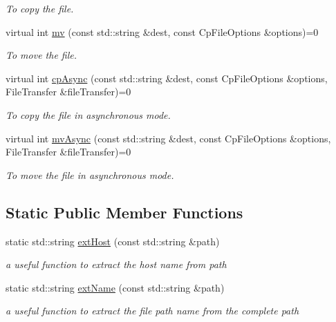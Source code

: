 \begin{DoxyCompactItemize}
\begin{DoxyCompactList}\small\item\em To copy the file. \item\end{DoxyCompactList}\item 
virtual int \hyperlink{classFileProxy_ac5ad61b772170696f71f37d784b59fa5}{mv} (const std::string \&dest, const CpFileOptions \&options)=0
\begin{DoxyCompactList}\small\item\em To move the file. \item\end{DoxyCompactList}\item 
virtual int \hyperlink{classFileProxy_afb7956f9e460ebf18622e5240f4f9dbf}{cpAsync} (const std::string \&dest, const CpFileOptions \&options, FileTransfer \&fileTransfer)=0
\begin{DoxyCompactList}\small\item\em To copy the file in asynchronous mode. \item\end{DoxyCompactList}\item 
virtual int \hyperlink{classFileProxy_a70e2f40c0b15d3640d631f914a2e627b}{mvAsync} (const std::string \&dest, const CpFileOptions \&options, FileTransfer \&fileTransfer)=0
\begin{DoxyCompactList}\small\item\em To move the file in asynchronous mode. \item\end{DoxyCompactList}\end{DoxyCompactItemize}
\subsection*{Static Public Member Functions}
\begin{DoxyCompactItemize}
\item 
static std::string \hyperlink{classFileProxy_ac1e4c8027e5e13ccbe1115f056d7b210}{extHost} (const std::string \&path)
\begin{DoxyCompactList}\small\item\em a useful function to extract the host name from path \item\end{DoxyCompactList}\item 
static std::string \hyperlink{classFileProxy_a73be5ad90755f66319b66f3fcf487f25}{extName} (const std::string \&path)
\begin{DoxyCompactList}\small\item\em a useful function to extract the file path name from the complete path \item\end{DoxyCompactList}\end{DoxyCompactItemize}
